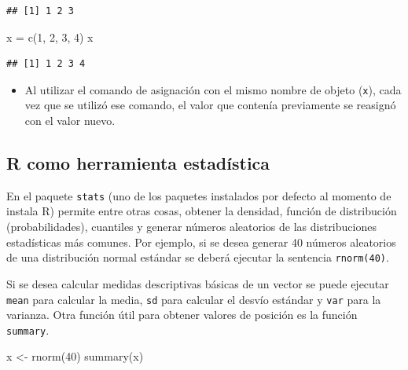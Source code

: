 \documentclass[
]{book}
\newenvironment{Shaded}{\begin{snugshade}}{\end{snugshade}}
\newcommand{\DecValTok}[1]{\textcolor[rgb]{0.00,0.00,0.81}{#1}}
\newcommand{\FunctionTok}[1]{\textcolor[rgb]{0.00,0.00,0.00}{#1}}
\newcommand{\NormalTok}[1]{#1}
\newcommand{\OtherTok}[1]{\textcolor[rgb]{0.56,0.35,0.01}{#1}}
\newenvironment{rmdblock}[1]
{\begin{shaded*}
		\begin{itemize}
			\renewcommand{\labelitemi}{
				\raisebox{-.7\height}[0pt][0pt]{
					{\setkeys{Gin}{width=3em,keepaspectratio}\texttt{[image: images/\#1]}}
				}
			}
			\item
		}
		{
		\end{itemize}
	\end{shaded*}
}
\newenvironment{rmdnote}
{\begin{rmdblock}{note}}
	{\end{rmdblock}}
\begin{document}
\begin{verbatim}
## [1] 1 2 3
\end{verbatim}

\begin{Shaded}
\begin{Highlighting}[]
\NormalTok{x }\OtherTok{=} \FunctionTok{c}\NormalTok{(}\DecValTok{1}\NormalTok{, }\DecValTok{2}\NormalTok{, }\DecValTok{3}\NormalTok{, }\DecValTok{4}\NormalTok{)}
\NormalTok{x}
\end{Highlighting}
\end{Shaded}

\begin{verbatim}
## [1] 1 2 3 4
\end{verbatim}

\begin{rmdnote}
Al utilizar el comando de asignación con el mismo nombre de objeto
(\texttt{x}), cada vez que se utilizó ese comando, el valor que contenía
previamente se reasignó con el valor nuevo.
\end{rmdnote}

\hypertarget{r-como-herramienta-estaduxedstica}{%
\subsection{R como herramienta estadística}\label{r-como-herramienta-estaduxedstica}}

En el paquete \texttt{stats} (uno de los paquetes instalados por defecto al momento de
instala R) permite entre otras cosas, obtener la densidad, función de
distribución (probabilidades), cuantiles y generar números aleatorios de las
distribuciones estadísticas más comunes. Por ejemplo, si se desea generar 40
números aleatorios de una distribución normal estándar se deberá ejecutar la
sentencia \texttt{rnorm(40)}.

Si se desea calcular medidas descriptivas básicas de un vector se puede
ejecutar \texttt{mean} para calcular la media, \texttt{sd} para calcular el desvío estándar
y \texttt{var} para la varianza. Otra función útil para obtener valores de posición
es la función \texttt{summary}.

\begin{Shaded}
\begin{Highlighting}[]
\NormalTok{x }\OtherTok{\textless{}{-}} \FunctionTok{rnorm}\NormalTok{(}\DecValTok{40}\NormalTok{)}
\FunctionTok{summary}\NormalTok{(x)}
\end{Highlighting}
\end{Shaded}
\end{document}
